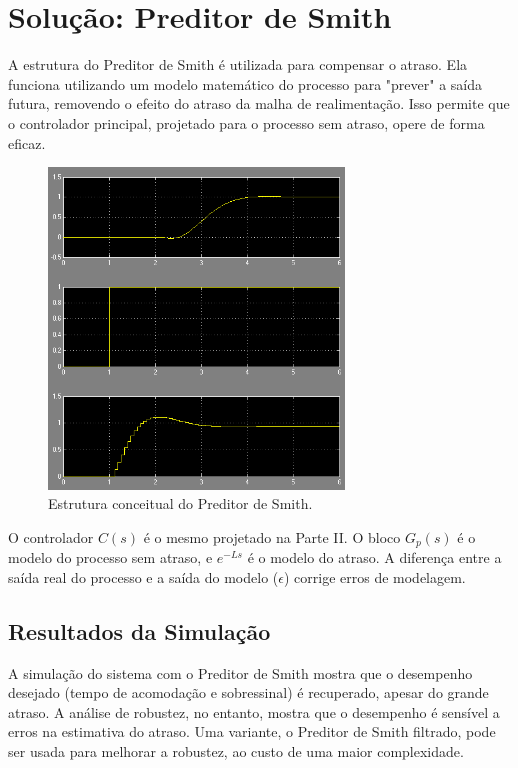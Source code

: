 \documentclass[a4paper,12pt]{report}
\begin{document}
\section{Solução: Preditor de Smith}
A estrutura do Preditor de Smith é utilizada para compensar o atraso. Ela funciona utilizando um modelo matemático do processo para "prever" a saída futura, removendo o efeito do atraso da malha de realimentação. Isso permite que o controlador principal, projetado para o processo sem atraso, opere de forma eficaz.

\begin{figure}[H]
    \centering
    \includegraphics[width=0.7\textwidth]{Imagens/q13.png}
    \caption{Estrutura conceitual do Preditor de Smith.}
    \label{fig:smith_predictor}
\end{figure}

O controlador \(C(s)\) é o mesmo projetado na Parte II. O bloco \(G_p(s)\) é o modelo do processo sem atraso, e \(e^{-Ls}\) é o modelo do atraso. A diferença entre a saída real do processo e a saída do modelo (\(\epsilon\)) corrige erros de modelagem.

\subsection{Resultados da Simulação}
A simulação do sistema com o Preditor de Smith mostra que o desempenho desejado (tempo de acomodação e sobressinal) é recuperado, apesar do grande atraso. A análise de robustez, no entanto, mostra que o desempenho é sensível a erros na estimativa do atraso. Uma variante, o Preditor de Smith filtrado, pode ser usada para melhorar a robustez, ao custo de uma maior complexidade.
\end{document}
